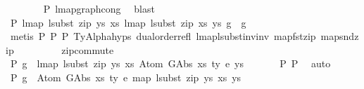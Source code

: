 \begin{isabellebody}
\ \ \ \ \ \ \isamarkupfalse%
\ P{}\ lmap{\isacharunderscore}{\kern0pt}graph{\isacharunderscore}{\kern0pt}cong\ \isamarkupfalse%
\ blast\isanewline
\ \ \isamarkupfalse%
\ P{}{\isacharcolon}{\kern0pt}\ {\isachardoublequoteopen}lmap\ {\isacharparenleft}{\kern0pt}lsubst\ {\isacharparenleft}{\kern0pt}zip\ ys{\isacharprime}{\kern0pt}\ xs{\isacharprime}{\kern0pt}{\isacharparenright}{\kern0pt}{\isacharparenright}{\kern0pt}\ {\isacharparenleft}{\kern0pt}lmap\ {\isacharparenleft}{\kern0pt}lsubst\ {\isacharparenleft}{\kern0pt}zip\ xs{\isacharprime}{\kern0pt}\ ys{\isacharprime}{\kern0pt}{\isacharparenright}{\kern0pt}{\isacharparenright}{\kern0pt}\ g{\isacharparenright}{\kern0pt}\ {\isacharequal}{\kern0pt}\ g{\isachardoublequoteclose}\isanewline
\ \ \ \ \ \isamarkupfalse%
\ {\isacharparenleft}{\kern0pt}metis\ P{}\ P{}\ P{}\ TyAlpha{\isachardot}{\kern0pt}hyps{\isacharparenleft}{\kern0pt}{}{\isacharparenright}{\kern0pt}\ dual{\isacharunderscore}{\kern0pt}order{\isachardot}{\kern0pt}refl\ lmap{\isacharunderscore}{\kern0pt}lsubst{\isacharunderscore}{\kern0pt}inv{\isacharunderscore}{\kern0pt}inv\ map{\isacharunderscore}{\kern0pt}fst{\isacharunderscore}{\kern0pt}zip\ map{\isacharunderscore}{\kern0pt}snd{\isacharunderscore}{\kern0pt}zip\isanewline
\ \ \ \ \ \ \ \ \ zip{\isacharunderscore}{\kern0pt}commute{\isacharparenright}{\kern0pt}\isanewline
\ \ \isamarkupfalse%
\ P{}{\isacharcolon}{\kern0pt}\ {\isachardoublequoteopen}g\ {\isasymsimeq}\ lmap\ {\isacharparenleft}{\kern0pt}lsubst\ {\isacharparenleft}{\kern0pt}zip\ ys{\isacharprime}{\kern0pt}\ xs{\isacharprime}{\kern0pt}{\isacharparenright}{\kern0pt}{\isacharparenright}{\kern0pt}\ {\isacharparenleft}{\kern0pt}Atom\ {\isacharparenleft}{\kern0pt}GAbs\ xs\ ty{}{\isacharprime}{\kern0pt}\ e{\isacharparenright}{\kern0pt}\ ys{\isacharparenright}{\kern0pt}{\isachardoublequoteclose}\isanewline
\ \ \ \ \ \isamarkupfalse%
\ P{}\ P{}\ \isamarkupfalse%
\ auto\isanewline
\ \ \isamarkupfalse%
\ \isamarkupfalse%
\ P{}{\isacharcolon}{\kern0pt}\ {\isachardoublequoteopen}g\ {\isasymsimeq}\ Atom\ {\isacharparenleft}{\kern0pt}GAbs\ xs\ ty{}{\isacharprime}{\kern0pt}\ e{\isacharparenright}{\kern0pt}\ {\isacharparenleft}{\kern0pt}map\ {\isacharparenleft}{\kern0pt}lsubst\ {\isacharparenleft}{\kern0pt}zip\ ys{\isacharprime}{\kern0pt}\ xs{\isacharprime}{\kern0pt}{\isacharparenright}{\kern0pt}{\isacharparenright}{\kern0pt}\ ys{\isacharparenright}{\kern0pt}{\isachardoublequoteclose}\isanewline

\end{isabellebody}
